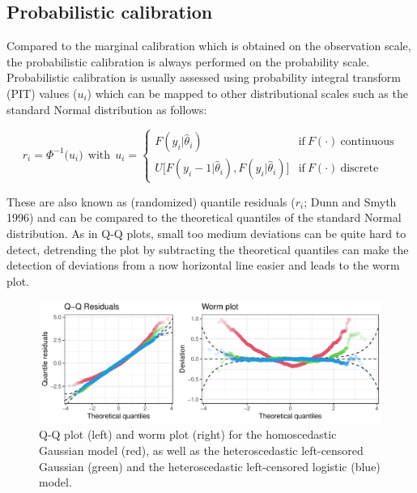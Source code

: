 \documentclass[twoside]{report}
\begin{document}


\subsection{Probabilistic calibration}

Compared to the marginal calibration which is obtained on the observation
scale, the probabilistic calibration is always performed on the probability
scale. Probabilistic calibration is usually assessed using probability
integral transform (PIT) values ($u_i$) which can be mapped to other
distributional scales such as the standard Normal distribution as follows:

$$
r_i = \Phi^{-1}\big(u_i)~~\text{with}~~u_i = \begin{cases}
    F(y_i | \hat{\theta}_i) & \text{if}~F(\cdot)~\text{continuous}  \\
    U\big[F(y_i - 1 | \hat{\theta}_i), F(y_i | \hat{\theta}_i)\big] & \text{if}~F(\cdot)~\text{discrete}
\end{cases}
$$

These are also known as (randomized) quantile residuals ($r_i$; Dunn and Smyth
1996) and can be compared to the theoretical quantiles of the standard Normal
distribution.  As in Q-Q plots, small too medium deviations can be quite hard
to detect, detrending the plot by subtracting the theoretical quantiles can
make the detection of deviations from a now horizontal line easier and leads to
the worm plot.

\begin{figure}[!ht]\centering
    \includegraphics[width=\textwidth]{Stauffer-qqresiduals}
    \caption{\label{stauffer:fig2} 
        Q-Q plot (left) and worm plot (right) for the homoscedastic
        Gaussian model (red), as well as the heteroscedastic left-censored
        Gaussian (green) and the heteroscedastic left-censored logistic (blue) model.
    }
\end{figure}
\end{document}
